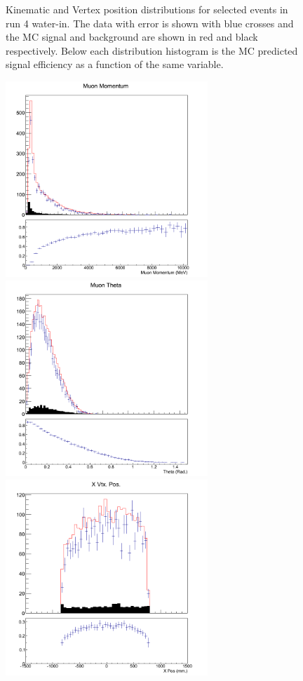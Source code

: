 \begin{figure}[h]
\caption{Kinematic and Vertex position distributions for selected events in run 4 water-in.  The data with error is shown with blue crosses and the MC signal and background are shown in red and black respectively. Below each distribution histogram is the MC predicted signal efficiency as a function of the same variable.}
\label{fig:xs1run4water}
\end{figure}

\begin{figure}[h]
\centering
\includegraphics[width=3in]{Figures/TN100Plots/c_Pair_2.png}
\includegraphics[width=3in]{Figures/TN100Plots/c_Thair_2.png}
\includegraphics[width=3in]{Figures/TN100Plots/c_Xair_2.png}

\end{figure}
